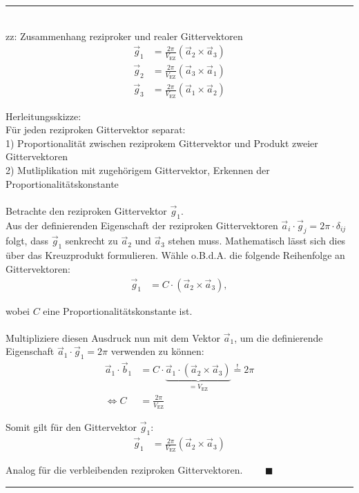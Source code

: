 \documentclass{article}
\begin{document}
{\color{violet}
\hrule
	\\
	zz: Zusammenhang reziproker und realer Gittervektoren
		\begin{align*}
			\vec{g}_1 &= \frac{2\pi}{V_\text{EZ}}(\vec{a}_2 \times \vec{a}_3) \\
			\vec{g}_2 &= \frac{2\pi}{V_\text{EZ}}(\vec{a}_3 \times \vec{a}_1) \\
			\vec{g}_3 &= \frac{2\pi}{V_\text{EZ}}(\vec{a}_1 \times \vec{a}_2)
		\end{align*}

	Herleitungsskizze:\\
	Für jeden reziproken Gittervektor separat:\\
	1) Proportionalität zwischen reziprokem Gittervektor und Produkt zweier Gittervektoren \\
	2) Mutliplikation mit zugehörigem Gittervektor, Erkennen der Proportionalitätskonstante \\
	\\
	Betrachte den reziproken Gittervektor $\vec{g}_1$.\\
	Aus der definierenden Eigenschaft der reziproken Gittervektoren $\vec{a}_i \cdot \vec{g}_j = 2\pi \cdot \delta_{ij}$ folgt, dass $\vec{g}_1$ senkrecht zu $\vec{a}_2$ und $\vec{a}_3$ stehen muss. Mathematisch lässt sich dies über das Kreuzprodukt formulieren. Wähle o.B.d.A. die folgende Reihenfolge an Gittervektoren:
		\begin{align*}
			\vec{g}_1 &= C \cdot (\vec{a}_2 \times \vec{a}_3),
		\end{align*}
	
	wobei $C$ eine Proportionalitätskonstante ist.\\
	\\
	Multipliziere diesen Ausdruck nun mit dem Vektor $\vec{a}_1$, um die definierende Eigenschaft $\vec{a}_1 \cdot \vec{g}_1 = 2\pi$ verwenden zu können:
		\begin{align*}
			\vec{a}_1 \cdot \vec{b}_1 &= C \cdot \underbrace{ \vec{a}_1 \cdot (\vec{a}_2 \times \vec{a}_3) }_{= V_\text{EZ}} \stackrel{!}{=} 2\pi \\
			\Leftrightarrow C &= \frac{2\pi}{V_\text{EZ}}
		\end{align*}
	
	Somit gilt für den Gittervektor $\vec{g}_1$:
		\begin{align*}
			\vec{g}_1 &= \frac{2\pi}{V_\text{EZ}} (\vec{a}_2 \times \vec{a}_3)
		\end{align*}
	
	Analog für die verbleibenden reziproken Gittervektoren. $\qquad \blacksquare$
\hrule
}
\end{document}
